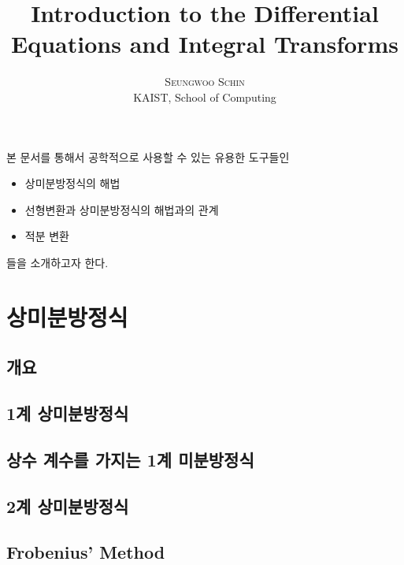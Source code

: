\documentclass[twoside]{article}
\title{\vspace{-15mm}\fontsize{24pt}{10pt}\selectfont\textbf{Introduction to the Differential Equations and Integral Transforms}} %
\author{
\large
\textsc{Seungwoo Schin}\\[2mm] %
\normalsize KAIST, School of Computing  \\ %
\vspace{-5mm}
}
\date{}
\begin{document}
\maketitle %

\thispagestyle{fancy} %



본 문서를 통해서 공학적으로 사용할 수 있는 유용한 도구들인 

\begin{itemize} 
\item 상미분방정식의 해법 
\item 선형변환과 상미분방정식의 해법과의 관계
\item 적분 변환
\end{itemize}

들을 소개하고자 한다. 

\section{상미분방정식} 

\subsection{개요} 



\subsection{1계 상미분방정식} 

\subsection{상수 계수를 가지는 1계 미분방정식}

\subsection{2계 상미분방정식} 

\subsection{Frobenius' Method} 
\end{document}
